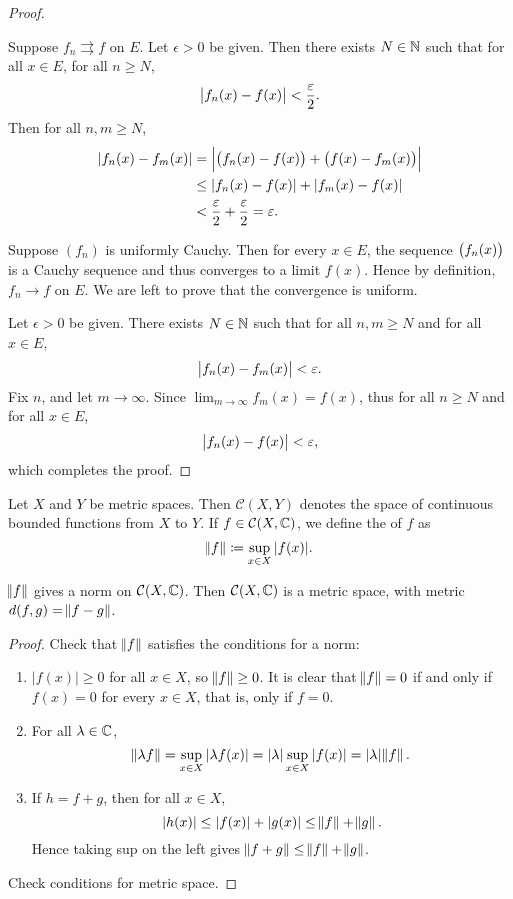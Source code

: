 \begin{proof} \

\fbox{$\implies$} Suppose $f_n\rightrightarrows f$ on $E$. Let $\epsilon>0$ be given. Then there exists $N\in\mathbb N$ such that for all $x\in E$, for all $n\ge N$,
\[\left|f_n(x)-f(x)\right|<\frac{\varepsilon}{2}.\]
Then for all $n,m\ge N$,
\begin{align*}
|f_n(x)-f_m(x)|
&=\left|\left(f_n(x)-f(x)\right)+\left(f(x)-f_m(x)\right)\right|\\
&\le|f_n(x)-f(x)|+|f_m(x)-f(x)|\\
&<\frac{\varepsilon}{2}+\frac{\varepsilon}{2}=\varepsilon.
\end{align*}

\fbox{$\impliedby$} Suppose $(f_n)$ is uniformly Cauchy. Then for every $x\in E$, the sequence $\left(f_n(x)\right)$ is a Cauchy sequence and thus converges to a limit $f(x)$. Hence by definition, $f_n\to f$ on $E$. We are left to prove that the convergence is uniform.

Let $\epsilon>0$ be given. There exists $N\in\mathbb N$ such that for all $n,m\ge N$ and for all $x\in E$,
\[\left|f_n(x)-f_m(x)\right|<\varepsilon.\]
Fix $n$, and let $m\to\infty$. Since $\displaystyle\lim_{m\to\infty}f_m(x)=f(x)$, thus for all $n\ge N$ and for all $x\in E$,
\[\left|f_n(x)-f(x)\right|<\varepsilon,\]
which completes the proof.
\end{proof}

\begin{definition}
Let $X$ and $Y$ be metric spaces. Then $\mathcal{C}(X,Y)$ denotes the space of continuous bounded functions from $X$ to $Y$. If $f\in\mathcal{C}(X,\mathbb C)$, we define the  of $f$ as
\[\norm{f}\coloneqq\sup_{x\in X}|f(x)|.\]
\end{definition}

\begin{lemma}
$\norm{f}$ gives a norm on $\mathcal{C}(X,\mathbb C)$. Then $\mathcal{C}(X,\mathbb C)$ is a metric space, with metric $d(f,g)=\norm{f-g}$.
\end{lemma}

\begin{proof}
Check that $\norm{f}$ satisfies the conditions for a norm:
\begin{enumerate}[label=(\roman*)]
\item $|f(x)|\ge0$ for all $x\in X$, so $\norm{f}\ge0$. It is clear that $\norm{f}=0$ if and only if $f(x)=0$ for every $x\in X$, that is, only if $f=0$.
\item For all $\lambda\in\mathbb C$,
\[\norm{\lambda f}=\sup_{x\in X}|\lambda f(x)|=|\lambda|\sup_{x\in X}|f(x)|=|\lambda|\norm{f}.\]
\item If $h=f+g$, then for all $x\in X$,
\[|h(x)|\le|f(x)|+|g(x)|\le\norm{f}+\norm{g}.\]
Hence taking sup on the left gives $\norm{f+g}\le\norm{f}+\norm{g}$.
\end{enumerate}
Check conditions for metric space.
\end{proof}

